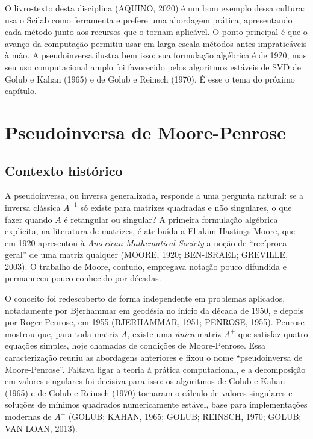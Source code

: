 \documentclass[12pt,a4paper,oneside]{report}
\newcommand{\Ap}{A^{+}}
\begin{document}
O livro-texto desta disciplina (AQUINO, 2020) é um bom exemplo dessa cultura: usa o Scilab como ferramenta e prefere uma abordagem prática, apresentando cada método junto aos recursos que o tornam aplicável. O ponto principal é que o avanço da computação permitiu usar em larga escala métodos antes impraticáveis à mão. A pseudoinversa ilustra bem isso: sua formulação algébrica é de 1920, mas seu uso computacional amplo foi favorecido pelos algoritmos estáveis de SVD de Golub e Kahan (1965) e de Golub e Reinsch (1970). É esse o tema do próximo capítulo.

\chapter{Pseudoinversa de Moore-Penrose}

\section{Contexto histórico}

A pseudoinversa, ou inversa generalizada, responde a uma pergunta natural: se a inversa
clássica $A^{-1}$ só existe para matrizes quadradas e não singulares, o que fazer quando $A$
é retangular ou singular? A primeira formulação algébrica explícita, na literatura de matrizes,
é atribuída a Eliakim Hastings Moore, que em 1920 apresentou à \emph{American Mathematical
Society} a noção de ``recíproca geral'' de uma matriz qualquer (MOORE, 1920; BEN-ISRAEL;
GREVILLE, 2003). O trabalho de Moore, contudo, empregava notação pouco difundida e permaneceu
pouco conhecido por décadas.

O conceito foi redescoberto de forma independente em problemas aplicados, notadamente por Bjerhammar em geodésia no início da década de 1950, e depois por Roger Penrose, em 1955 (BJERHAMMAR, 1951; PENROSE, 1955). Penrose mostrou que, para toda matriz $A$, existe uma \emph{única} matriz $\Ap$ que satisfaz quatro equações simples, hoje chamadas de condições de Moore-Penrose. Essa caracterização reuniu as abordagens anteriores e fixou o nome ``pseudoinversa de Moore-Penrose''. Faltava ligar a teoria à prática computacional, e a decomposição em valores singulares foi decisiva para isso: os algoritmos de Golub e Kahan (1965) e de Golub e Reinsch (1970) tornaram o cálculo de valores singulares e soluções de mínimos quadrados numericamente estável, base para implementações modernas de $\Ap$ (GOLUB; KAHAN, 1965; GOLUB; REINSCH, 1970; GOLUB; VAN LOAN, 2013).
\end{document}
